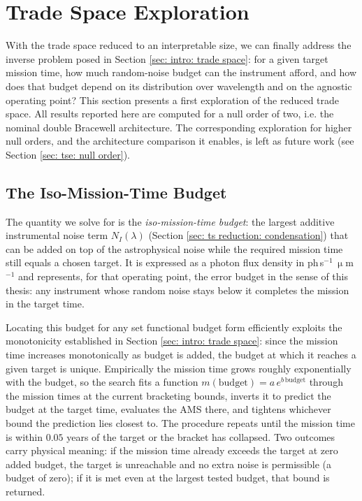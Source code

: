 \documentclass[12pt,a4paper]{article}
\numberwithin{equation}{section}
\numberwithin{figure}{section}
\numberwithin{table}{section}
\begin{document}
\section{Trade Space Exploration} \label{sec: tse}
With the trade space reduced to an interpretable size, we can finally address the inverse problem posed in Section \ref{sec: intro: trade space}: for a given target mission time, how much random-noise budget can the instrument afford, and how does that budget depend on its distribution over wavelength and on the agnostic operating point? This section presents a first exploration of the reduced trade space. All results reported here are computed for a null order of two, i.e. the nominal double Bracewell architecture. The corresponding exploration for higher null orders, and the architecture comparison it enables, is left as future work (see Section \ref{sec: tse: null order}).

\subsection{The Iso-Mission-Time Budget}
The quantity we solve for is the \textit{iso-mission-time budget}: the largest additive instrumental noise term $N_I(\lambda)$ (Section \ref{sec: ts reduction: condensation}) that can be added on top of the astrophysical noise while the required mission time still equals a chosen target. It is expressed as a photon flux density in ph\,s$^{-1}$\,$\upmu$m$^{-1}$ and represents, for that operating point, the error budget in the sense of this thesis: any instrument whose random noise stays below it completes the mission in the target time.

Locating this budget for any set functional budget form efficiently exploits the monotonicity established in Section \ref{sec: intro: trade space}: since the mission time increases monotonically as budget is added, the budget at which it reaches a given target is unique. Empirically the mission time grows roughly exponentially with the budget, so the search fits a function $m(\text{budget}) = a\,e^{b\,\text{budget}}$ through the mission times at the current bracketing bounds, inverts it to predict the budget at the target time, evaluates the AMS there, and tightens whichever bound the prediction lies closest to. The procedure repeats until the mission time is within $0.05$ years of the target or the bracket has collapsed. Two outcomes carry physical meaning: if the mission time already exceeds the target at zero added budget, the target is unreachable and no extra noise is permissible (a budget of zero); if it is met even at the largest tested budget, that bound is returned.
\end{document}
